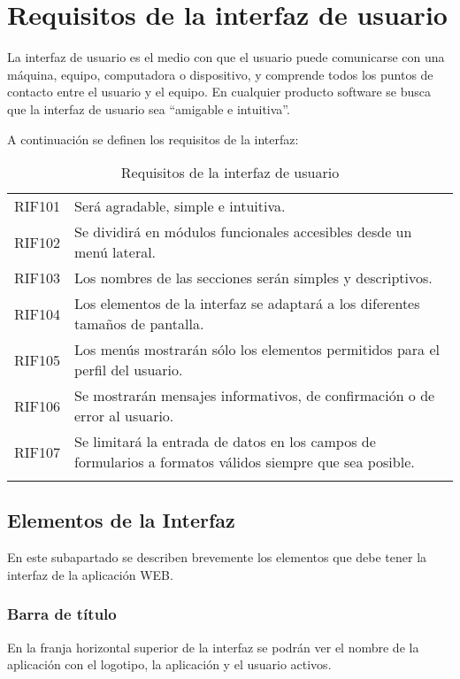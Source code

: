 \renewcommand{\arraystretch}{1} %


\section{Requisitos de la interfaz de usuario}
La interfaz de usuario es el medio con que el usuario puede comunicarse con una máquina, equipo, computadora o dispositivo, y comprende todos los puntos de contacto entre el usuario y el equipo\cite{Interfaz}. En cualquier producto software se busca que la interfaz de usuario sea ``amigable e intuitiva''. 

A continuación se definen los requisitos de la interfaz:

\label{cuadro:requisitos-de-la-interfaz}
\begin{longtable}{l|p{13.7cm}}
  RIF101\label{RIF101} & Será agradable, simple e intuitiva. \\
  RIF102\label{RIF102} & Se dividirá en módulos funcionales accesibles desde un menú lateral. \\
  RIF103\label{RIF103} & Los nombres de las secciones serán simples y descriptivos. \\
  RIF104\label{RIF104} & Los elementos de la interfaz se adaptará a los diferentes tamaños de pantalla. \\
  RIF105\label{RIF105} & Los menús mostrarán sólo los elementos permitidos para el perfil del usuario. \\
  RIF106\label{RIF106} & Se mostrarán mensajes informativos, de confirmación o de error al usuario. \\
  RIF107\label{RIF107} & Se limitará la entrada de datos en los campos de formularios a formatos válidos siempre que sea posible. \\
  \caption{Requisitos de la interfaz de usuario} \\
\end{longtable}

\subsection{Elementos de la Interfaz}
En este subapartado se describen brevemente los elementos que debe tener la interfaz de la aplicación WEB. 

\subsubsection*{Barra de título}
En la franja horizontal superior de la interfaz se podrán ver el nombre de la aplicación con el logotipo, la aplicación y el usuario activos.

